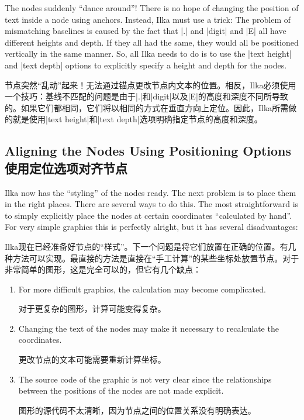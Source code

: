 The nodes suddenly ``dance around''! There is no hope of changing the position
of text inside a node using anchors. Instead, Ilka must use a trick: The
problem of mismatching baselines is caused by the fact that |.| and |digit| and
|E| all have different heights and depth. If they all had the same, they would
all be positioned vertically in the same manner. So, all Ilka needs to do is to
use the |text height| and |text depth| options to explicitly specify a height
and depth for the nodes.

节点突然“乱动”起来！无法通过锚点更改节点内文本的位置。相反，Ilka必须使用一个技巧：基线不匹配的问题是由于|.|和|digit|以及|E|的高度和深度不同所导致的。如果它们都相同，它们将以相同的方式在垂直方向上定位。因此，Ilka所需做的就是使用|text height|和|text depth|选项明确指定节点的高度和深度。



%
\begin{codeexample}[preamble={\usetikzlibrary{positioning,shapes.misc}}]
\end{codeexample}


\subsection{Aligning the Nodes Using Positioning Options\\使用定位选项对齐节点}

Ilka now has the ``styling'' of the nodes ready. The next problem is to place
them in the right places. There are several ways to do this. The most
straightforward is to simply explicitly place the nodes at certain coordinates
``calculated by hand''. For very simple graphics this is perfectly alright, but
it has several disadvantages:

Ilka现在已经准备好节点的“样式”。下一个问题是将它们放置在正确的位置。有几种方法可以实现。最直接的方法是直接在“手工计算”的某些坐标处放置节点。对于非常简单的图形，这是完全可以的，但它有几个缺点：
%
\begin{enumerate}
    \item For more difficult graphics, the calculation may become
        complicated.

        对于更复杂的图形，计算可能变得复杂。
    \item Changing the text of the nodes may make it necessary to recalculate
        the coordinates.

        更改节点的文本可能需要重新计算坐标。
    \item The source code of the graphic is not very clear since the
        relationships between the positions of the nodes are not made
        explicit.

        图形的源代码不太清晰，因为节点之间的位置关系没有明确表达。
\end{enumerate}

